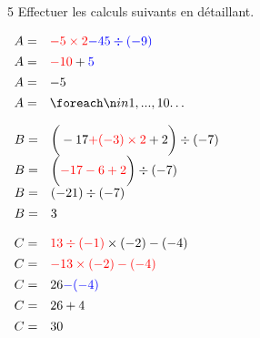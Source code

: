 \documentclass[a4paper]{book}
\begin{document}
{\newpage


     \begin{exerciceNote}{5}
        Effectuer les calculs suivants en détaillant.

        \medskip

        \begin{minipage}{0.30\linewidth}
            $\begin{array}{ll}
                A = & \textcolor{red}{-5\times2}\textcolor{blue}{-45\div(-9)} \\[1ex]
                A = & \textcolor{red}{-10}+\textcolor{blue}{5}\\[1ex]
                A = & -5\\[1ex]
                A = & \points[10]
            \end{array}$

            \vspace{1cm}

            $\begin{array}{ll}
                B = & \bigg(-17\textcolor{red}{+(-3)\times2}+2\bigg)\div(-7) \\[1ex]
                B = & \bigg(\textcolor{red}{-17-6+2}\bigg)\div(-7)\\[1ex]
                B = & (-21)\div(-7)\\[1ex]
                B = & 3
            \end{array}$
        \end{minipage}
        \hfill
        \begin{minipage}{0.30\linewidth}
            $\begin{array}{ll}
                C = & \textcolor{red}{13\div(-1)}\times(-2)-(-4) \\[1ex]
                C = & \textcolor{red}{-13\times(-2)-(-4)} \\[1ex]
                C = & 26\textcolor{blue}{-(-4)} \\[1ex]
                C = & 26+4 \\[1ex]
                C = & 30
            \end{array}$

            \vspace{1cm}


\end{minipage}
\end{exerciceNote}}
\end{document}
